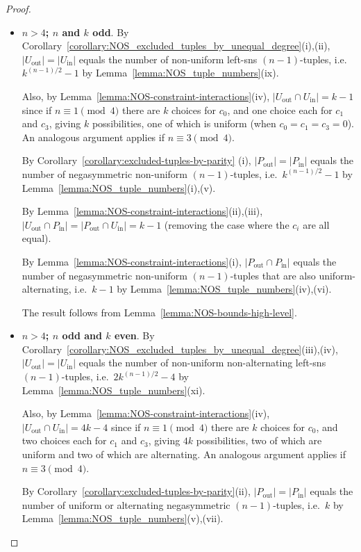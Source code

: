 \documentclass[10pt,a4paper]{amsart}
\begin{document}
\begin{proof}
\begin{itemize}
\item[iv)a)] {\bf $n>4$; $n$ and $k$ odd}.  By
    Corollary~\ref{corollary:NOS_excluded_tuples_by_unequal_degree}(i),(ii),
    $|U_{\text{out}}|=|U_{\text{in}}|$ equals the number of non-uniform left-sns
    $(n-1)$-tuples, i.e.\ $k^{(n-1)/2}-1$ by Lemma~\ref{lemma:NOS_tuple_numbers}(ix).

    Also, by Lemma~\ref{lemma:NOS-constraint-interactions}(iv), $|U_{\text{out}}\cap
    U_{\text{in}}|=k-1$ since if $n\equiv 1\pmod 4$ there are $k$ choices for $c_0$, and one
    choice each for $c_1$ and $c_3$, giving $k$ possibilities, one of which is uniform (when
    $c_0=c_1=c_3=0$). An analogous argument applies if $n\equiv 3 \pmod 4$.

    By Corollary~\ref{corollary:excluded-tuples-by-parity} (i),
    $|P_{\text{out}}|=|P_{\text{in}}|$ equals the number of negasymmetric non-uniform
    $(n-1)$-tuples, i.e.\ $k^{(n-1)/2}-1$ by Lemma~\ref{lemma:NOS_tuple_numbers}(i),(v).

    By Lemma~\ref{lemma:NOS-constraint-interactions}(ii),(iii), $|U_{\text{out}}\cap
    P_{\text{in}}|=|P_{\text{out}}\cap U_{\text{in}}|=k-1$ (removing the case where the $c_i$
    are all equal).

    By Lemma~\ref{lemma:NOS-constraint-interactions}(i), $|P_{\text{out}}\cap P_{\text{in}}|$
    equals the number of negasymmetric non-uniform $(n-1)$-tuples that are also
    uniform-alternating, i.e.\ $k-1$ by Lemma~\ref{lemma:NOS_tuple_numbers}(iv),(vi).

    The result follows from Lemma~\ref{lemma:NOS-bounds-high-level}.


\item[iv)b)] {\bf $n>4$; $n$ odd and $k$ even}.  By
    Corollary~\ref{corollary:NOS_excluded_tuples_by_unequal_degree}(iii),(iv),
    $|U_{\text{out}}|=|U_{\text{in}}|$ equals the number of non-uniform non-alternating
    left-sns $(n-1)$-tuples, i.e.\ $2k^{(n-1)/2}-4$ by Lemma~\ref{lemma:NOS_tuple_numbers}(xi).

    Also, by Lemma~\ref{lemma:NOS-constraint-interactions}(iv), $|U_{\text{out}}\cap
    U_{\text{in}}|=4k-4$ since if $n\equiv 1\pmod 4$ there are $k$ choices for $c_0$, and two
    choices each for $c_1$ and $c_3$, giving $4k$ possibilities, two of which are uniform and
    two of which are alternating. An analogous argument applies if $n\equiv 3 \pmod 4$.

    By Corollary~\ref{corollary:excluded-tuples-by-parity}(ii),
    $|P_{\text{out}}|=|P_{\text{in}}|$ equals the number of uniform or alternating
    negasymmetric $(n-1)$-tuples, i.e.\ $k$ by Lemma~\ref{lemma:NOS_tuple_numbers}(v),(vii).


\end{itemize}
\end{proof}
\end{document}
